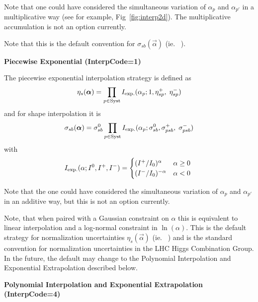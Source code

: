 Note that one could have considered the simultaneous variation of $\alpha_{p}$ and $\alpha_{p'}$ in a multiplicative way (see for example, Fig~\ref{fig:interp2d}).  The multiplicative accumulation is not an option currently.


Note that this is the default convention for $\sigma_{sb}(\vec{\alpha})$ (ie. \HS\ ).


{\flushleft\bf Piecewise Exponential (InterpCode=1)}


The piecewise exponential interpolation strategy is defined as
\begin{equation}
\eta_s ({\boldsymbol \alpha}) = \prod_{p\in\textrm{Syst}} I_{\rm exp.}(\alpha_p; 1,\eta_{sp}^+, \; \eta_{sp}^- ) 
\end{equation}
and for shape interpolation it is
\begin{equation}
\sigma_{sb} ({\boldsymbol \alpha}) = \sigma_{sb}^0 \prod_{p\in\textrm{Syst}} I_{\rm exp.}(\alpha_p;  \sigma_{sb}^0, \sigma_{psb}^+ ,\;
\sigma_{psb}^- )  
\end{equation}
with
\begin{equation}
 I_{\rm exp.}(\alpha;  I^0, I^+,I^- ) =
 \begin{cases}
     (I^+/I_0)^ \alpha  &  \text{$\alpha\ge 0$} \\
     (I^-/I_0)^{-\alpha}  &  \text{$\alpha<0$ }
 \end{cases}
\end{equation}


Note that the one could have considered the simultaneous variation of $\alpha_{p}$ and $\alpha_{p'}$ in an additive way, but this is not an option currently.


Note, that when paired with a Gaussian constraint on $\alpha$ this is equivalent to  linear interpolation and a log-normal constraint in $\ln(\alpha)$.  This is the default strategy for normalization uncertainties $\eta_{s}(\vec{\alpha})$ (ie. \OS\ ) and is the standard convention for normalization uncertainties in the LHC Higgs Combination Group.  In the future, the default may change to the Polynomial Interpolation and Exponential Extrapolation described below.


{\flushleft \bf Polynomial Interpolation and Exponential Extrapolation (InterpCode=4)}


